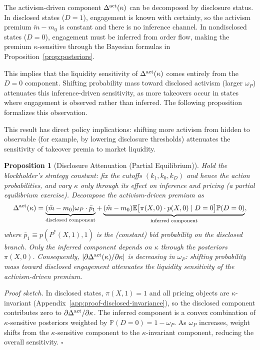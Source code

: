 \documentclass[11pt]{article}
\newtheorem{proposition}{Proposition}
\newcommand{\E}{\mathbb{E}}
\newcommand{\PP}{\mathbb{P}}
\newcommand{\1}{\mathbf{1}}
\begin{document}
The activism-driven component $\Delta^{\textup{act}}(\kappa)$ can be decomposed by disclosure status. In disclosed states ($D=1$), engagement is known with certainty, so the activism premium $\tilde{m}-m_0$ is constant and there is no inference channel. In nondisclosed states ($D=0$), engagement must be inferred from order flow, making the premium $\kappa$-sensitive through the Bayesian formulas in Proposition~\ref{prop:posteriors}.

This implies that the liquidity sensitivity of $\Delta^{\textup{act}}(\kappa)$ comes entirely from the $D=0$ component. Shifting probability mass toward disclosed activism (larger $\omega_P$) attenuates this inference-driven sensitivity, as more takeovers occur in states where engagement is observed rather than inferred. The following proposition formalizes this observation.

This result has direct policy implications: shifting more activism from hidden to observable (for example, by lowering disclosure thresholds) attenuates the sensitivity of takeover premia to market liquidity.

\begin{proposition}[Disclosure Attenuation (Partial Equilibrium)]
\label{prop:disclosure-attenuation}
Hold the blockholder's strategy constant: fix the cutoffs $(k_1,k_0,k_D)$ and hence the action probabilities, and vary $\kappa$ only through its effect on inference and pricing (a partial equilibrium exercise). Decompose the activism-driven premium as
\[
\Delta^{\textup{act}}(\kappa) = \underbrace{(\tilde{m}-m_0)\omega_P \cdot \bar{p}_1}_{\text{disclosed component}} + \underbrace{(\tilde{m}-m_0)\E\big[\pi(X,0)\cdot p(X,0) \mid D=0\big]\PP(D=0)}_{\text{inferred component}},
\]
where $\bar{p}_1 \equiv p(P^*(X,1),1)$ is the (constant) bid probability on the disclosed branch. Only the inferred component depends on $\kappa$ through the posteriors $\pi(X,0)$. Consequently, $|\partial \Delta^{\textup{act}}(\kappa)/\partial\kappa|$ is decreasing in $\omega_P$: shifting probability mass toward disclosed engagement attenuates the liquidity sensitivity of the activism-driven premium.
\end{proposition}

\textit{Proof sketch.} In disclosed states, $\pi(X,1)=1$ and all pricing objects are $\kappa$-invariant (Appendix~\ref{app:proof-disclosed-invariance}), so the disclosed component contributes zero to $\partial\Delta^{\textup{act}}/\partial\kappa$. The inferred component is a convex combination of $\kappa$-sensitive posteriors weighted by $\PP(D=0)=1-\omega_P$. As $\omega_P$ increases, weight shifts from the $\kappa$-sensitive component to the $\kappa$-invariant component, reducing the overall sensitivity. \hfill$\square$
\end{document}

